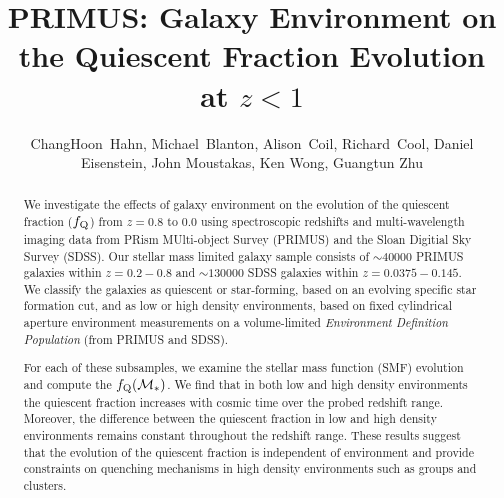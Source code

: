 \documentclass{emulateapj}
\begin{document}
\title{PRIMUS: Galaxy Environment on the Quiescent Fraction Evolution at $z < 1$}
\author{
ChangHoon~Hahn, 
Michael~Blanton, 
Alison~Coil, 
Richard~Cool, 
Daniel Eisenstein,
John Moustakas, 
Ken Wong, 
Guangtun Zhu
}

\begin{abstract}
We investigate the effects of galaxy environment on the evolution of the quiescent fraction ($f_{\rm{Q}}$) from $z =0.8 $ to $ 0.0$ using spectroscopic redshifts and multi-wavelength imaging data from PRism MUlti-object Survey (PRIMUS) and the Sloan Digitial Sky Survey (SDSS). Our stellar mass limited galaxy sample consists of $\sim 40000$ PRIMUS galaxies within $z = 0.2-0.8$ and $\sim 130000$ SDSS galaxies within $z = 0.0375-0.145$. We classify the galaxies as quiescent or star-forming, based on an evolving specific star formation cut, and as low or high density environments, based on fixed cylindrical aperture environment measurements on a volume-limited {\em Environment Definition Population} (from PRIMUS and SDSS). 

For each of these subsamples, we examine the stellar mass function (SMF) evolution and compute the $f_{\rm{Q}}(\mathcal{M}_{*})$. We find that in both low and high density environments the quiescent fraction increases with cosmic time over the probed redshift range. Moreover, the difference between the quiescent fraction in low and high density environments remains constant throughout the redshift range. These results suggest that the evolution of the quiescent fraction is independent of environment and provide constraints on quenching mechanisms in high density environments such as groups and clusters.  
\end{abstract}
\end{document}
